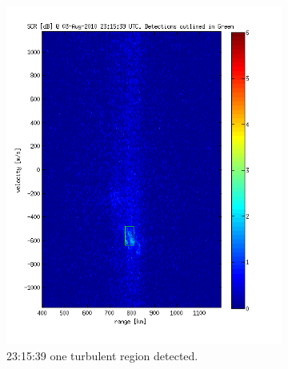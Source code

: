 \begin{figure}\ContinuedFloat \centering
    \begin{subfigure}[t]{0.45\linewidth}
        \includegraphics[width=\linewidth]{gfx/out-004}
        \caption{23:15:39 one turbulent region detected.}
    \end{subfigure}
    \begin{subfigure}[t]{0.45\linewidth}

\end{subfigure}
\end{figure}
